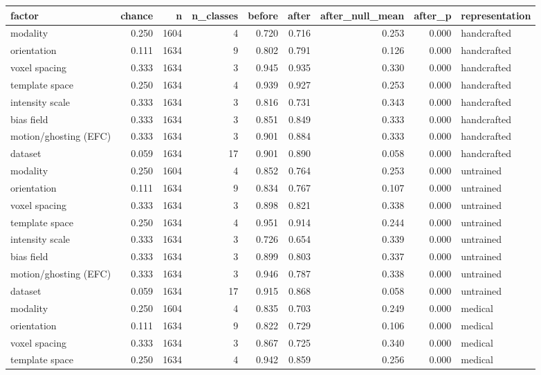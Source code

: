\begin{tabular}{lrrrrrrrl}
\toprule
factor & chance & n & n\_classes & before & after & after\_null\_mean & after\_p & representation \\
\midrule
modality & 0.250 & 1604 & 4 & 0.720 & 0.716 & 0.253 & 0.000 & handcrafted \\
orientation & 0.111 & 1634 & 9 & 0.802 & 0.791 & 0.126 & 0.000 & handcrafted \\
voxel spacing & 0.333 & 1634 & 3 & 0.945 & 0.935 & 0.330 & 0.000 & handcrafted \\
template space & 0.250 & 1634 & 4 & 0.939 & 0.927 & 0.253 & 0.000 & handcrafted \\
intensity scale & 0.333 & 1634 & 3 & 0.816 & 0.731 & 0.343 & 0.000 & handcrafted \\
bias field & 0.333 & 1634 & 3 & 0.851 & 0.849 & 0.333 & 0.000 & handcrafted \\
motion/ghosting (EFC) & 0.333 & 1634 & 3 & 0.901 & 0.884 & 0.333 & 0.000 & handcrafted \\
dataset & 0.059 & 1634 & 17 & 0.901 & 0.890 & 0.058 & 0.000 & handcrafted \\
modality & 0.250 & 1604 & 4 & 0.852 & 0.764 & 0.253 & 0.000 & untrained \\
orientation & 0.111 & 1634 & 9 & 0.834 & 0.767 & 0.107 & 0.000 & untrained \\
voxel spacing & 0.333 & 1634 & 3 & 0.898 & 0.821 & 0.338 & 0.000 & untrained \\
template space & 0.250 & 1634 & 4 & 0.951 & 0.914 & 0.244 & 0.000 & untrained \\
intensity scale & 0.333 & 1634 & 3 & 0.726 & 0.654 & 0.339 & 0.000 & untrained \\
bias field & 0.333 & 1634 & 3 & 0.899 & 0.803 & 0.337 & 0.000 & untrained \\
motion/ghosting (EFC) & 0.333 & 1634 & 3 & 0.946 & 0.787 & 0.338 & 0.000 & untrained \\
dataset & 0.059 & 1634 & 17 & 0.915 & 0.868 & 0.058 & 0.000 & untrained \\
modality & 0.250 & 1604 & 4 & 0.835 & 0.703 & 0.249 & 0.000 & medical \\
orientation & 0.111 & 1634 & 9 & 0.822 & 0.729 & 0.106 & 0.000 & medical \\
voxel spacing & 0.333 & 1634 & 3 & 0.867 & 0.725 & 0.340 & 0.000 & medical \\
template space & 0.250 & 1634 & 4 & 0.942 & 0.859 & 0.256 & 0.000 & medical \\

\end{tabular}
